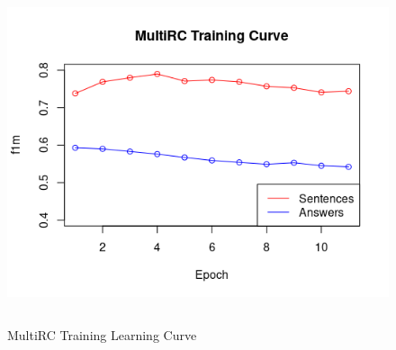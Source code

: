 \documentclass[12pt, a4paper]{article}
\begin{document}
	\begin{figure}
		\includegraphics[width=\textwidth,height=10cm]{images/multirc.png}
		\caption{MultiRC Training Learning Curve}
	\end{figure}

	\printbibliography
	
\end{document}
